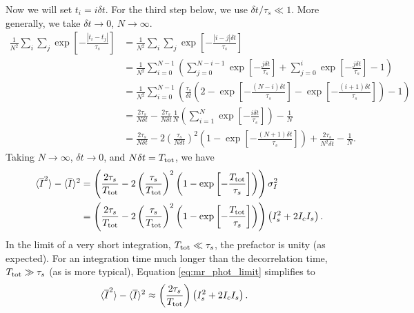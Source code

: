 \documentclass[../main.tex]{subfiles}
\begin{document}
Now we will set $t_i = i \delta t$.  For the third step below, we use $\delta t/\tau_s \ll 1$. More generally, we take $\delta t \rightarrow 0$, $N \rightarrow \infty$.
\begin{align}
    \frac{1}{N^2} \sum_i \sum_j \exp \left[ - \frac{|t_i - t_j|}{\tau_s} \right] &= \frac{1}{N^2} \sum_i \sum_j \exp \left[ - \frac{|i - j|\delta t}{\tau_s} \right] \\
    &= \frac{1}{N^2} \sum_{i=0}^{N-1} \left( \sum_{j=0}^{N-i-1} \exp \left[ -\frac{j\delta t}{\tau_s}\right] + \sum_{j=0}^{i} \exp \left[ -\frac{j\delta t}{\tau_s}\right] - 1\right)\\
    &= \frac{1}{N^2} \sum_{i=0}^{N-1} \left( \frac{\tau_s}{\delta t} \left(2 - \exp \left[ -\frac{(N - i) \delta t}{\tau_s} \right] - \exp \left[ -\frac{(i + 1) \delta t}{\tau_s} \right] \right) - 1 \right)\\
    &= \frac{2 \tau_s}{N \delta t}  - \frac{2 \tau_s}{N \delta t} \frac{1}{N} \left(\sum_{i=1}^N \exp \left[ -\frac{i \delta t}{\tau_s} \right] \right) - \frac{1}{N} \\
    &= \frac{2 \tau_s}{N \delta t}  - 2 \left(\frac{\tau_s}{N \delta t} \right)^2 \left(1 - \exp \left[ -\frac{(N + 1) \delta t}{\tau_s} \right] \right) + \frac{2\tau_s}{N^2 \delta t} - \frac{1}{N} . 
\end{align}
Taking $N \rightarrow \infty$, $\delta t \rightarrow 0$, and $N \delta t = T_{\rm tot}$, we have
\begin{align}
    \langle \overline{I}^2 \rangle - \langle \overline{I} \rangle^2 &= \left( \frac{2 \tau_s}{T_{\rm tot}}  - 2 \left(\frac{\tau_s}{T_{\rm tot}} \right)^2 \left(1 - \exp \left[ -\frac{T_{\rm tot}}{\tau_s} \right] \right) \right) \sigma^2_I \\
    &= \left( \frac{2 \tau_s}{T_{\rm tot}}  - 2 \left(\frac{\tau_s}{T_{\rm tot}} \right)^2 \left(1 - \exp \left[ -\frac{T_{\rm tot}}{\tau_s} \right] \right) \right) \left( I_s^2 + 2 I_c I_s \right).
    \label{eq:mr_phot_limit}
\end{align}
In the limit of a very short integration, $T_{\rm tot} \ll \tau_s$, the prefactor is unity (as expected).  For an integration time much longer than the decorrelation time, $T_{\rm tot} \gg \tau_s$ (as is more typical), Equation \eqref{eq:mr_phot_limit} simplifies to
\begin{align}
    \langle \overline{I}^2 \rangle - \langle \overline{I} \rangle^2 &\approx \left( \frac{2 \tau_s}{T_{\rm tot}} \right) \left( I_s^2 + 2 I_c I_s \right).
    \label{eq:mr_phot_limit_simple}
\end{align}
\end{document}
